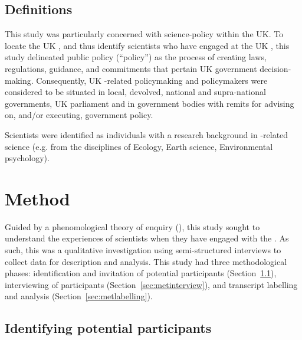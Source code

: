 \subsection{Definitions}\label{sec:metdefinitions}

This study was particularly concerned with \CAN{} science-policy within the UK. To locate the UK \SPI, and thus identify scientists who have engaged at the UK \SPI, this study delineated public policy (``policy'') as the process of creating laws, regulations, guidance, and commitments that pertain UK government decision-making. Consequently, UK \CAN-related policymaking and policymakers were considered to be situated in local, devolved, national and supra-national governments, UK parliament and in government bodies with remits for advising on, and/or executing, \CAN{} government policy.

Scientists were identified as individuals with a research background in \CAN-related science (e.g. from the disciplines of Ecology, Earth science, Environmental psychology).


\section{Method}\label{sec:method}

Guided by a phenomological theory of enquiry (\cite{CreswellP2017}), this study sought to understand the experiences of \CAN{} scientists when they have engaged with the \SPI. As such, this was a qualitative investigation using semi-structured interviews to collect data for description and analysis. This study had three methodological phases: identification and invitation of potential participants (Section~\ref{sec:metidentify}), interviewing of participants (Section~\ref{sec:metinterview}), and transcript labelling and analysis (Section~\ref{sec:metlabelling}). %

\subsection{Identifying potential participants}\label{sec:metidentify}

